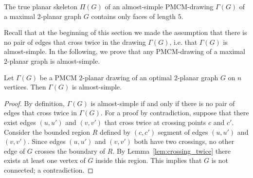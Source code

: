  \begin{corollary}\label{cor:2_planar_faces}
  The true planar skeleton $\Pi(G)$ of an almost-simple PMCM-drawing $\Gamma(G)$ of a maximal $2$-planar graph $G$ contains only faces of length $5$.
 \end{corollary}

Recall that at the beginning of this section we made the assumption that there is no pair of edges that cross twice in the drawing $\Gamma(G)$, i.e. that $\Gamma(G)$ is almost-simple. In the following, we prove that any PMCM-drawing of a maximal $2$-planar graph is almost-simple.

\begin{lemma}
Let $\Gamma(G)$ be a PMCM $2$-planar drawing of an optimal $2$-planar graph $G$ on $n$ vertices. Then $\Gamma(G)$ is almost-simple.

\label{lem:2_planar_cross_twice}
\end{lemma}

\begin{proof}
By definition, $\Gamma(G)$ is almost-simple if and only if there is no pair of edges that cross twice in $\Gamma(G)$. For a proof by contradiction, suppose that there exist edges $(u,u')$ and $(v,v')$ that cross twice at crossing points $c$ and $c'$. Consider the bounded region $R$ defined by $(c,c')$ segment of edges $(u,u')$ and $(v,v')$. Since edges $(u,u')$ and $(v,v')$ both have two crossings, no other edge of $G$ crosses the boundary of $R$. By Lemma~\ref{lem:crossing_twice} there exists at least one vertex of $G$ inside this region. This implies that $G$ is not connected; a contradiction. 
\end{proof}


